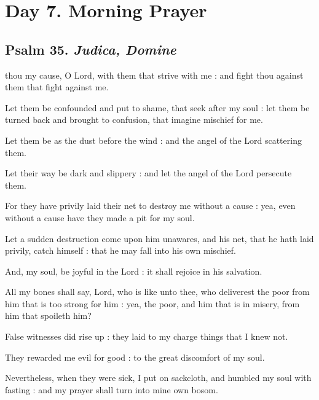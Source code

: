 \section*{Day 7. Morning Prayer}

\subsection{Psalm 35. \textit{Judica, Domine}}

 thou my cause, O Lord, with them that strive with me : and fight thou against them that fight against me.\par
{}
Let them be confounded and put to shame, that seek after my soul : let them be turned back and brought to confusion, that imagine mischief for me.\par
{}Let them be as the dust before the wind : and the angel of the Lord scattering them.\par
{}Let their way be dark and slippery : and let the angel of the Lord persecute them.\par
{}For they have privily laid their net to destroy me without a cause : yea, even without a cause have they made a pit for my soul.\par
{}Let a sudden destruction come upon him unawares, and his net, that he hath laid privily, catch himself : that he may fall into his own mischief.\par
{}And, my soul, be joyful in the Lord : it shall rejoice in his salvation.\par
{}All my bones shall say, Lord, who is like unto thee, who deliverest the poor from him that is too strong for him : yea, the poor, and him that is in misery, from him that spoileth him?\par
{}False witnesses did rise up : they laid to my charge things that I knew not.\par
{}They rewarded me evil for good : to the great discomfort of my soul.\par
{}Nevertheless, when they were sick, I put on sackcloth, and humbled my soul with fasting : and my prayer shall turn into mine own bosom.\par

